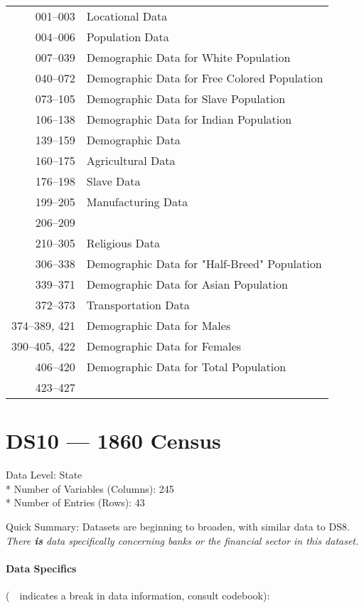 ﻿\documentclass[12pt]{report}
\begin{document}
	\begin{tabular}{r|l}
		001--003 & Locational Data\\
		004--006 & Population Data\\
		007--039 & Demographic Data for White Population\\
		040--072 & Demographic Data for Free Colored Population\\
		073--105 & Demographic Data for Slave Population\\
		106--138 & Demographic Data for Indian Population\\
		139--159 & Demographic Data\\
		160--175 & Agricultural Data\\
		176--198 & Slave Data\\
		199--205 & Manufacturing Data\\
		206--209 & \guillemotleft~\guillemotright\\
		210--305 & Religious Data\\
		306--338 & Demographic Data for "Half-Breed" Population\\
		339--371 & Demographic Data for Asian Population\\
		372--373 & Transportation Data\\
		374--389, 421 & Demographic Data for Males\\
		390--405, 422 & Demographic Data for Females\\
		406--420 & Demographic Data for Total Population\\
		423--427 & \guillemotleft~\guillemotright\\
	\end{tabular}
	\newpage

\section{DS10 --- 1860 Census}
	Data Level: State\\*
	Number of Variables (Columns): 245\\*
	Number of Entries (Rows): 43
	\vspace{1.5em}

	\noindent Quick Summary: Datasets are beginning to broaden, with similar data to DS8. \textit{There \emph{\textbf{is}} data specifically concerning banks or the financial sector in this dataset.}
	
	\paragraph{Data Specifics} (\guillemotleft~\guillemotright~indicates a break in data information, consult codebook):
	\vspace{1em}
	
\end{document}
